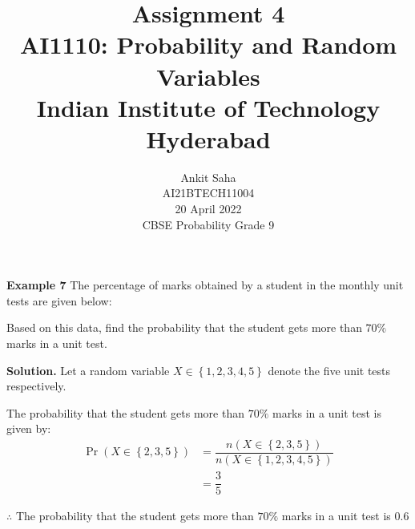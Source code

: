 \documentclass[journal,12pt,twocolumn]{IEEEtran}
\title{Assignment 4 \\ \Large AI1110: Probability and Random Variables \\ \large Indian Institute of Technology Hyderabad}
\author{Ankit Saha \\ \normalsize AI21BTECH11004 \\ \vspace*{20pt} \normalsize  20 April 2022 \\ \vspace*{20pt} \Large CBSE Probability Grade 9}
\providecommand{\pr}[1]{\ensuremath{\Pr\left(#1\right)}}
\providecommand{\cbrak}[1]{\ensuremath{\left\{#1\right\}}}
\begin{document}
	\maketitle
	
	\textbf{Example 7} 
	The percentage of marks obtained by a student in the monthly unit tests are given below:
	\begin{table}[ht!]
		\centering
		
		\caption{}
		\label{table:table1}	
	\end{table}
	
	Based on this data, find the probability that the student gets more than $70\%$ marks in a unit test. 
	
	\textbf{Solution.}
	Let a random variable $X \in \cbrak{1,2,3,4,5}$ denote the five unit tests respectively. 
	
	The probability that the student gets more than $70\%$ marks in a unit test is given by:
	\begin{align}
	\pr{X \in \cbrak{2,3,5}} &= \dfrac{n(X \in \cbrak{2,3,5})}{n(X \in \cbrak{1,2,3,4,5})} \\
	&= \dfrac{3}{5}
	\end{align}
	
	$\therefore$ The probability that the student gets more than $70\%$ marks in a unit test is $0.6$
	
\end{document}
